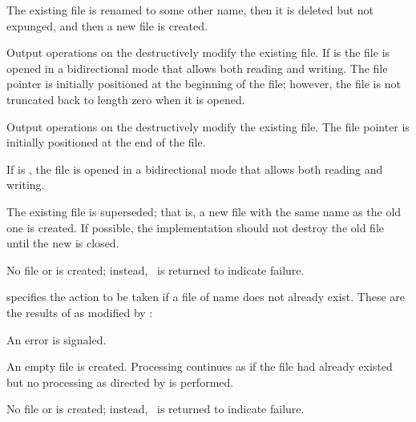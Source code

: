 
The existing file is renamed to some other name,
then it is deleted but not expunged, and then a new file is created.


Output operations on the  destructively modify the existing file.
If  is  the file is opened in a bidirectional mode
that allows both reading and writing.  The file pointer is initially 
positioned at the beginning of the file; however, the file is not truncated
back to length zero when it is opened.


Output operations on the  destructively modify the existing file.
The file pointer is initially positioned at the end of the file.

If  is ,
the file is opened in a bidirectional mode that allows both reading and writing.


The existing file is superseded;
that is, a new file with the same name as the old one is created.
If possible, the implementation should not destroy the old file until the new
 is closed.

\itemitem{\nil}

No file or  is created;
instead, \nil\ is returned to indicate failure.

\endlist
                                     

specifies the action to be taken if
a file of name  does not already exist.
These are the results of  as modified by :

\beginlist


An error  is signaled.


An empty file is created.
Processing continues  as if the file 
had already existed but no processing as 
directed by  is performed.

\itemitem{\nil}

No file or  is created;
instead, \nil\ is returned to indicate failure.

